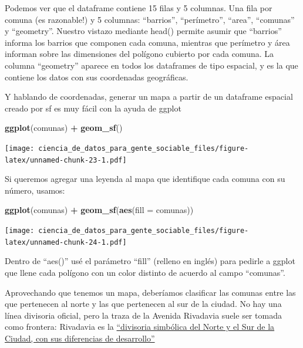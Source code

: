 \documentclass[]{book}
\newenvironment{Shaded}{\begin{snugshade}}{\end{snugshade}}
\newcommand{\KeywordTok}[1]{\textcolor[rgb]{0.13,0.29,0.53}{\textbf{#1}}}
\newcommand{\DataTypeTok}[1]{\textcolor[rgb]{0.13,0.29,0.53}{#1}}
\newcommand{\StringTok}[1]{\textcolor[rgb]{0.31,0.60,0.02}{#1}}
\newcommand{\OperatorTok}[1]{\textcolor[rgb]{0.81,0.36,0.00}{\textbf{#1}}}
\newcommand{\NormalTok}[1]{#1}
\begin{document}
Podemos ver que el dataframe contiene 15 filas y 5 columnas. Una fila
por comuna (es razonable!) y 5 columnas: ``barrios'', ``perímetro'',
``area'', ``comunas'' y ``geometry''. Nuestro vistazo mediante head()
permite asumir que ``barrios'' informa los barrios que componen cada
comuna, mientras que perímetro y área informan sobre las dimensiones del
polígono cubierto por cada comuna. La columna ``geometry'' aparece en
todos los dataframes de tipo espacial, y es la que contiene los datos
con sus coordenadas geográficas.

Y hablando de coordenadas, generar un mapa a partir de un dataframe
espacial creado por sf es muy fácil con la ayuda de ggplot

\begin{Shaded}
\begin{Highlighting}[]
\KeywordTok{ggplot}\NormalTok{(comunas) }\OperatorTok{+}
\StringTok{    }\KeywordTok{geom_sf}\NormalTok{()}
\end{Highlighting}
\end{Shaded}

\texttt{[image: ciencia\_de\_datos\_para\_gente\_sociable\_files/figure-latex/unnamed-chunk-23-1.pdf]}

Si queremos agregar una leyenda al mapa que identifique cada comuna con
su número, usamos:

\begin{Shaded}
\begin{Highlighting}[]
\KeywordTok{ggplot}\NormalTok{(comunas) }\OperatorTok{+}
\StringTok{    }\KeywordTok{geom_sf}\NormalTok{(}\KeywordTok{aes}\NormalTok{(}\DataTypeTok{fill =}\NormalTok{ comunas))}
\end{Highlighting}
\end{Shaded}

\texttt{[image: ciencia\_de\_datos\_para\_gente\_sociable\_files/figure-latex/unnamed-chunk-24-1.pdf]}

Dentro de ``aes()'' usé el parámetro ``fill'' (relleno en inglés) para
pedirle a ggplot que llene cada polígono con un color distinto de
acuerdo al campo ``comunas''.

Aprovechando que tenemos un mapa, deberíamos clasificar las comunas
entre las que pertenecen al norte y las que pertenecen al sur de la
ciudad. No hay una línea divisoria oficial, pero la traza de la Avenida
Rivadavia suele ser tomada como frontera: Rivadavia es la
\href{https://www.clarin.com/ediciones-anteriores/avenida-rivadaviaun-largo-recorrido-contrastes_0_B1reo181CYe.html}{``divisoria
simbólica del Norte y el Sur de la Ciudad, con sus diferencias de
desarrollo''}
\end{document}
